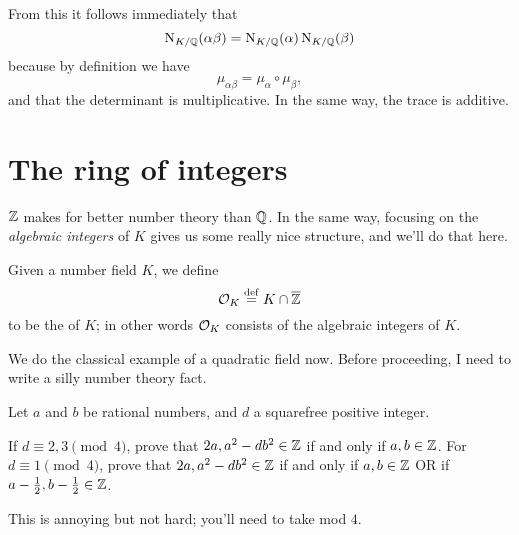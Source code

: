 From this it follows immediately that 
\[ \operatorname{N}_{K/\mathbb Q}(\alpha\beta) = \operatorname{N}_{K/\mathbb Q}(\alpha)\operatorname{N}_{K/\mathbb Q}(\beta) \]
because by definition we have 
\[ \mu_{\alpha\beta} = \mu_\alpha \circ \mu_\beta, \]
and that the determinant is multiplicative.
In the same way, the trace is additive.

\section{The ring of integers}

$\mathbb Z$ makes for better number theory than $\mathbb Q$.
In the same way, focusing on the \emph{algebraic integers} of $K$
gives us some really nice structure, and we'll do that here.

\begin{definition}
	Given a number field $K$, we define 
	\[ \mathcal O_K \overset{\mathrm{def}}{=} K \cap \overline{\mathbb Z} \]
	to be the  of $K$;
	in other words $\mathcal O_K$ consists of the algebraic integers of $K$.
\end{definition}

We do the classical example of a quadratic field now.
Before proceeding, I need to write a silly number theory fact.
\begin{exercise}
	Let $a$ and $b$ be rational numbers, and $d$ a squarefree positive integer.
	\begin{itemize}
		\ii If $d \equiv 2, 3 \pmod 4$, prove that
		$2a, a^2-db^2 \in \mathbb Z$ if and only if $a,b \in \mathbb Z$.
		\ii For $d \equiv 1 \pmod 4$, prove that
		$2a, a^2-db^2 \in \mathbb Z$ if and only if $a,b \in \mathbb Z$
		OR if $a -\frac{1}{2}, b-\frac{1}{2} \in \mathbb Z$.
	\end{itemize}
	This is annoying but not hard; you'll need to take mod $4$.
\end{exercise}

